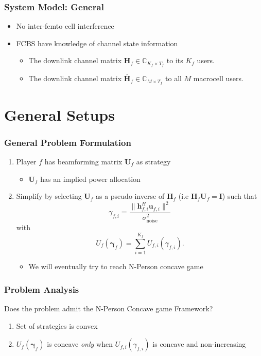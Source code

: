 \documentclass[10pt,tgadventor, onlymath]{beamer}
\begin{document}
\begin{frame}
\frametitle{System Model: General}
\begin{itemize}
\item 
	No inter-femto cell interference
\item 
	FCBS have knowledge of channel state information 
	\begin{itemize}
	\item 
	The downlink channel matrix $\mathbf{H}_f \in \mathbb{C}_{K_{f} \times T_{f}} $ to its $K_{f} $ users.
	\item The downlink channel matrix $\tilde{\mathbf{H}_{f}} \in \mathbb{C}_{M \times T_{f}}$ 
	to all $M$ macrocell users.
	\end{itemize}
\end{itemize}
\end{frame}


\section{General Setups}

\begin{frame}
\frametitle{General Problem Formulation}
\begin{enumerate}
\item  Player $f$ has beamforming matrix $\mathbf{U}_f$ as strategy
\begin{itemize}
\item $\mathbf{U}_f$ has an implied power allocation
\end{itemize}
\item Simplify by selecting $\mathbf{U}_f$ as a pseudo inverse of $\mathbf{H}_f$  (i.e $\mathbf{H}_f\mathbf{U}_f = \mathbf{I}$) such that 
	\begin{equation*}
	\gamma_{f,i} = \frac{\|\mathbf{h}^H_{f,i}\mathbf{u}_{f,i}\|^2}
	{\sigma^2_{\text{noise}}}
	\end{equation*}
	with 
	\begin{equation*}
	U_{f}(\boldsymbol{\gamma}_{f}) =
	\sum_{i=1}^{K_{f}}
    	 U_{f,i}(\gamma_{f,i}) .
	\end{equation*}
\begin{itemize}
\item We will eventually try to reach N-Person concave game
\end{itemize}
\end{enumerate}
\end{frame}



\begin{frame}
\frametitle{Problem Analysis}
Does the problem admit the N-Person Concave game Framework? 
\\
\begin{enumerate}
\item  Set of strategies is convex \faThumbsOUp
\pause
\item  $U_{f}(\boldsymbol{\gamma}_{f})$ is concave \emph{only} when $U_{f,i}(\gamma_{f,i})$ is concave and non-increasing 
\faThumbsODown
\end{enumerate}
\end{frame}
\end{document}
